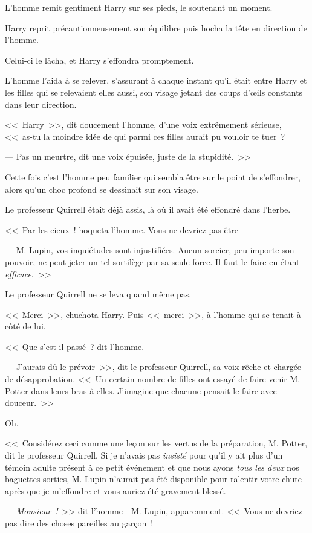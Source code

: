 L'homme remit gentiment Harry sur ses pieds, le soutenant un moment.

Harry reprit précautionneusement son équilibre puis hocha la tête en direction de l'homme.

Celui-ci le lâcha, et Harry s'effondra promptement.

L'homme l'aida à se relever, s'assurant à chaque instant qu'il était entre Harry et les filles qui se relevaient elles aussi, son visage jetant des coups d'œils constants dans leur direction.

<<~Harry~>>, dit doucement l'homme, d'une voix extrêmement sérieuse, <<~as-tu la moindre idée de qui parmi ces filles aurait pu vouloir te tuer~?

--- Pas un meurtre, dit une voix épuisée, juste de la stupidité.~>>

Cette fois c'est l'homme peu familier qui sembla être sur le point de s'effondrer, alors qu'un choc profond se dessinait sur son visage.

Le professeur Quirrell était déjà assis, là où il avait été effondré dans l'herbe.

<<~Par les cieux~! hoqueta l'homme. Vous ne devriez pas être -

--- M. Lupin, vos inquiétudes sont injustifiées. Aucun sorcier, peu importe son pouvoir, ne peut jeter un tel sortilège par sa seule force. Il faut le faire en étant \emph{efficace}.~>>

Le professeur Quirrell ne se leva quand même pas.

<<~Merci~>>, chuchota Harry. Puis <<~merci~>>, à l'homme qui se tenait à côté de lui.

<<~Que s'est-il passé~? dit l'homme.

--- J'aurais dû le prévoir~>>, dit le professeur Quirrell, sa voix rêche et chargée de désapprobation. <<~Un certain nombre de filles ont essayé de faire venir M. Potter dans leurs bras à elles. J'imagine que chacune pensait le faire avec douceur.~>>

Oh.

<<~Considérez ceci comme une leçon sur les vertus de la préparation, M. Potter, dit le professeur Quirrell. Si je n'avais pas \emph{insisté} pour qu'il y ait plus d'un témoin adulte présent à ce petit événement et que nous ayons \emph{tous les deux} nos baguettes sorties, M. Lupin n'aurait pas été disponible pour ralentir votre chute après que je m'effondre et vous auriez été gravement blessé.

--- \emph{Monsieur~!}~>> dit l'homme - M. Lupin, apparemment. <<~Vous ne devriez pas dire des choses pareilles au garçon~!

